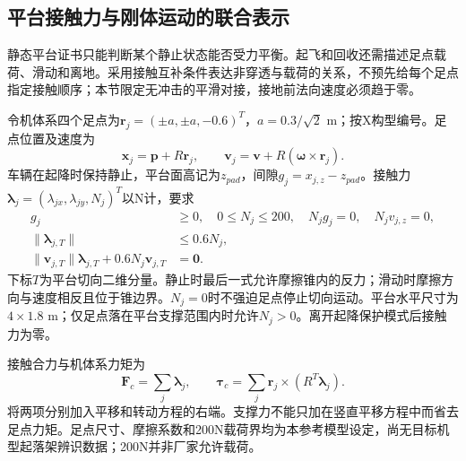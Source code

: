 \subsection{平台接触力与刚体运动的联合表示}
静态平台证书只能判断某个静止状态能否受力平衡。起飞和回收还需描述足点载荷、滑动和离地。采用接触互补条件表达非穿透与载荷的关系\cite{PosaContact2014}，不预先给每个足点指定接触顺序；本节限定无冲击的平滑对接，接地前法向速度必须趋于零。

令机体系四个足点为$\mathbf r_j=(\pm a,\pm a,-0.6)^T$，$a=0.3/\sqrt2$ m；按X构型编号。足点位置及速度为
\begin{equation}
 \mathbf x_j=\mathbf p+R\mathbf r_j,\qquad
 \mathbf v_j=\mathbf v+R(\boldsymbol\omega\times\mathbf r_j).
 \label{s0404:foot_kinematics}
\end{equation}
车辆在起降时保持静止，平台面高记为$z_{pad}$，间隙$g_j=x_{j,z}-z_{pad}$。接触力$\boldsymbol\lambda_j=(\lambda_{jx},\lambda_{jy},N_j)^T$以N计，要求
\begin{subequations}
\label{s0404:contact_complementarity}
\begin{align}
 g_j&\ge0,\quad0\le N_j\le200,\quad N_jg_j=0,\quad N_jv_{j,z}=0,\\
 \|\boldsymbol\lambda_{j,T}\|&\le0.6N_j,\\
 \|\mathbf v_{j,T}\|\boldsymbol\lambda_{j,T}
             +0.6N_j\mathbf v_{j,T}&=\mathbf0.
\end{align}
\end{subequations}
下标$T$为平台切向二维分量。静止时最后一式允许摩擦锥内的反力；滑动时摩擦方向与速度相反且位于锥边界。$N_j=0$时不强迫足点停止切向运动。平台水平尺寸为$4\times1.8$ m；仅足点落在平台支撑范围内时允许$N_j>0$。离开起降保护模式后接触力为零。

接触合力与机体系力矩为
\begin{equation}
 \mathbf F_c=\sum_j\boldsymbol\lambda_j,\qquad
 \boldsymbol\tau_c=\sum_j\mathbf r_j\times(R^T\boldsymbol\lambda_j).
 \label{s0404:contact_wrench}
\end{equation}
将两项分别加入平移和转动方程的右端。支撑力不能只加在竖直平移方程中而省去足点力矩。足点尺寸、摩擦系数和200N载荷界均为本参考模型设定，尚无目标机型起落架辨识数据；200N并非厂家允许载荷。

